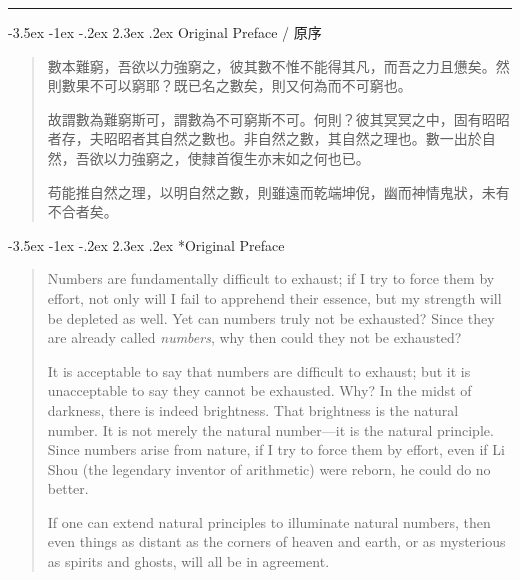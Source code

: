 \documentclass[11pt,a4paper]{article}
\makeatletter
\newlength{\chwidth}
\newlength{\enwidth}
\newcommand{\zh}[1]{{\CJKfamily{sf}#1}}
\newenvironment{bilingual}{%
  \noindent
  \begin{minipage}[t]{\chwidth}%
  \small
}{%
  \end{minipage}%
}
\newcommand{\switchcolumn}{%
  \end{minipage}%
  \hfill%
  \begin{minipage}[t]{\enwidth}%
  \small
}
\renewcommand{\section}{\@startsection{section}{1}{\z@}%
  {-3.5ex \@plus -1ex \@minus -.2ex}%
  {2.3ex \@plus .2ex}%
  {\normalfont\Large\bfseries\color{sectioncolor}}}
\newcommand{\zhsection}[1]{\par\vspace{0.3cm}\noindent{\Large\bfseries\color{sectioncolor}#1}\par\vspace{0.2cm}}
\makeatother
\begin{document}
\vspace{0.5cm}
\noindent\textcolor{rulecolor}{\rule{\textwidth}{0.4pt}}

\newpage
\section{Original Preface / 原序}
\label{sec:preface}

\begin{bilingual}
\zhsection{原序}

\begin{quote}
\zh{數本難窮，吾欲以力強窮之，彼其數不惟不能得其凡，而吾之力且憊矣。然則數果不可以窮耶？既已名之數矣，則又何為而不可窮也。}

\vspace{0.3cm}
\zh{故謂數為難窮斯可，謂數為不可窮斯不可。何則？彼其冥冥之中，固有昭昭者存，夫昭昭者其自然之數也。非自然之數，其自然之理也。數一出於自然，吾欲以力強窮之，使隸首復生亦末如之何也已。}

\vspace{0.3cm}
\zh{苟能推自然之理，以明自然之數，則雖遠而乾端坤倪，幽而神情鬼狀，未有不合者矣。}
\end{quote}

\switchcolumn

\section*{Original Preface}

\begin{quote}
Numbers are fundamentally difficult to exhaust; if I try to force them by effort, not only will I fail to apprehend their essence, but my strength will be depleted as well. Yet can numbers truly not be exhausted? Since they are already called \textit{numbers}, why then could they not be exhausted?

\vspace{0.3cm}
It is acceptable to say that numbers are difficult to exhaust; but it is unacceptable to say they cannot be exhausted. Why? In the midst of darkness, there is indeed brightness. That brightness is the natural number. It is not merely the natural number---it is the natural principle. Since numbers arise from nature, if I try to force them by effort, even if Li Shou (the legendary inventor of arithmetic) were reborn, he could do no better.

\vspace{0.3cm}
If one can extend natural principles to illuminate natural numbers, then even things as distant as the corners of heaven and earth, or as mysterious as spirits and ghosts, will all be in agreement.
\end{quote}
\end{bilingual}
\end{document}
